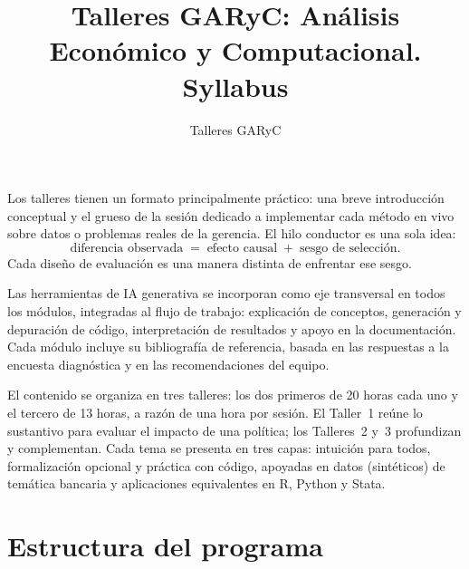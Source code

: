 \documentclass[11pt]{article}
\title{Talleres GARyC: Análisis Económico y Computacional. Syllabus}
\author{Talleres GARyC}
\date{}
\begin{document}

\begin{presentacion}
Los talleres tienen un formato principalmente práctico: una breve
introducción conceptual y el grueso de la sesión dedicado a implementar
cada método en vivo sobre datos o problemas reales de la gerencia. El
hilo conductor es una sola idea:
\[
  \text{diferencia observada} \;=\; \text{efecto causal} \;+\; \text{sesgo de selección}.
\]
Cada diseño de evaluación es una manera distinta de enfrentar ese sesgo.

Las herramientas de IA generativa se incorporan como eje transversal en
todos los módulos, integradas al flujo de trabajo: explicación de
conceptos, generación y depuración de código, interpretación de
resultados y apoyo en la documentación. Cada módulo incluye su
bibliografía de referencia, basada en las respuestas a la encuesta
diagnóstica y en las recomendaciones del equipo.

El contenido se organiza en tres talleres: los dos primeros de 20 horas
cada uno y el tercero de 13 horas, a razón de una hora por sesión. El
Taller~1 reúne lo sustantivo para evaluar el impacto de una política;
los Talleres~2 y~3 profundizan y complementan. Cada tema se presenta en
tres capas: intuición para todos, formalización opcional y práctica con
código, apoyadas en datos (sintéticos) de temática bancaria y
aplicaciones equivalentes en R, Python y Stata.
\end{presentacion}

\clearpage
\section*{Estructura del programa}
\end{document}
